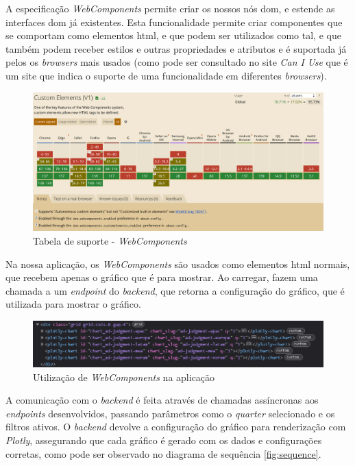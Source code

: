 A especificação \textit{WebComponents}\cite{webcomponents} permite criar os nossos nós \gls{dom}, e estende as interfaces \gls{dom} já existentes. Esta funcionalidade permite criar componentes que se comportam como elementos \gls{html}, e que podem ser utilizados como tal, e que também podem receber estilos e outras propriedades e atributos e é suportada já pelos os \textit{browsers} mais usados (como pode ser consultado no site \textit{Can I Use}\cite{caniuse} que é um site que indica o suporte de uma funcionalidade em diferentes \textit{browsers}).

\begin{figure}[H]
    \centering
    \includegraphics[max width=\textwidth]{./img/caniuse}
 \caption{Tabela de suporte - \textit{WebComponents}}
 \end{figure}

Na nossa aplicação, os \textit{WebComponents} são usados como elementos \gls{html} normais, que recebem apenas o gráfico que é para mostrar. Ao carregar, fazem uma chamada a um \textit{endpoint} do \textit{backend}, que retorna a configuração do gráfico, que é utilizada para mostrar o gráfico.

\begin{figure}[H]
    \centering
    \includegraphics[max width=\textwidth]{./img/webc}
 \caption{Utilização de \textit{WebComponents} na aplicação}
 \end{figure}

A comunicação com o \textit{backend} é feita através de chamadas assíncronas aos \textit{endpoints} desenvolvidos, passando parâmetros como o \textit{quarter} selecionado e os filtros ativos. O \textit{backend} devolve a configuração do gráfico para renderização com \textit{Plotly}, assegurando que cada gráfico é gerado com os dados e configurações corretas, como pode ser observado no diagrama de sequência \ref{fig:sequence}.

